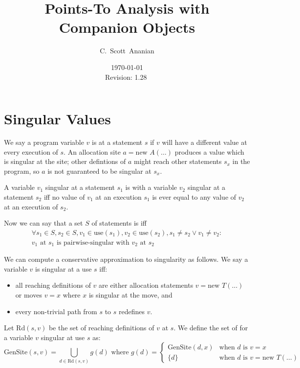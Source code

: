 \documentclass[11pt,notitlepage]{article}
\author{C.~Scott~Ananian}
\title{Points-To Analysis with Companion Objects}
\date{\today \\ $ $Revision: 1.28 $ $}
\begin{document}

\maketitle
\section{Singular Values}

We say a program variable $v$ is  at a statement $s$
if $v$ will have a different value at every execution of $s$.  An
allocation site $a = \text{new }A(\ldots)$ produces a value which is singular
at the site; other defintions of $a$ might reach other statements
$s_x$ in the program, so $a$ is not guaranteed to be singular at $s_x$.

A variable $v_1$ singular at a statement $s_1$ is
 with a variable $v_2$ singular at a statement
$s_2$ iff no value of $v_1$ at an execution $s_1$ is ever equal to any
value of $v_2$ at an execution of $s_2$.

Now we can say that a set $S$ of statements is
 iff
\begin{multline*}
\forall s_1 \in S, s_2 \in S, v_1 \in \text{use}(s_1), v_2 \in \text{use}(s_2),
  s_1 \neq s_2 \vee v_1 \neq v_2:
\\
v_1 \text{ at } s_1 \text{ is pairwise-singular with } v_2 \text{ at } s_2
\end{multline*}

We can compute a conservative approximation to singularity as follows.
We say a variable $v$ is singular at a use $s$ iff:
\begin{itemize}
\item all reaching definitions of $v$ are either allocation statements 
$v = \text{new }T(\ldots)$ or moves $v = x$ where $x$ is singular at
the move, and
\item every non-trivial path from $s$ to $s$ redefines $v$.
\end{itemize}

Let $\text{Rd}(s,v)$ be the set of reaching definitions of $v$ at $s$.
We define the set of  for a variable $v$ singular at
use $s$ as:
\begin{displaymath}
\text{GenSite}(s,v) %
 =
\bigcup_{d \in \text{Rd}(s,v)} g(d)
\text{ where }
g(d) = \begin{cases}
                \text{GenSite}(d,x) &\text{when } d \text{ is } v=x \\
                \{d\}&\text{when } d \text{ is } v=\text{new } T(\ldots)
       \end{cases}
\end{displaymath}
\end{document}
